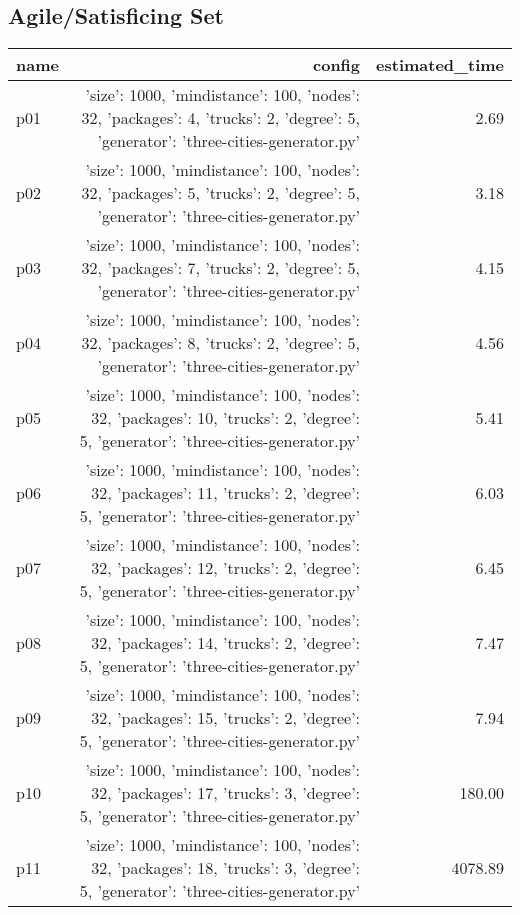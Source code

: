 \documentclass{article}
\begin{document}
                                \subsection*{Agile/Satisficing Set}
                                
                            \begin{center}
                            \scriptsize
                            \begin{tabular}{@{}l|r|r@{}}
                            name & config & estimated\_time\\\midrule
                              p01&{'size': 1000, 'mindistance': 100, 'nodes': 32, 'packages': 4, 'trucks': 2, 'degree': 5, 'generator': 'three-cities-generator.py'}&2.69\\
  p02&{'size': 1000, 'mindistance': 100, 'nodes': 32, 'packages': 5, 'trucks': 2, 'degree': 5, 'generator': 'three-cities-generator.py'}&3.18\\
  p03&{'size': 1000, 'mindistance': 100, 'nodes': 32, 'packages': 7, 'trucks': 2, 'degree': 5, 'generator': 'three-cities-generator.py'}&4.15\\
  p04&{'size': 1000, 'mindistance': 100, 'nodes': 32, 'packages': 8, 'trucks': 2, 'degree': 5, 'generator': 'three-cities-generator.py'}&4.56\\
  p05&{'size': 1000, 'mindistance': 100, 'nodes': 32, 'packages': 10, 'trucks': 2, 'degree': 5, 'generator': 'three-cities-generator.py'}&5.41\\
  p06&{'size': 1000, 'mindistance': 100, 'nodes': 32, 'packages': 11, 'trucks': 2, 'degree': 5, 'generator': 'three-cities-generator.py'}&6.03\\
  p07&{'size': 1000, 'mindistance': 100, 'nodes': 32, 'packages': 12, 'trucks': 2, 'degree': 5, 'generator': 'three-cities-generator.py'}&6.45\\
  p08&{'size': 1000, 'mindistance': 100, 'nodes': 32, 'packages': 14, 'trucks': 2, 'degree': 5, 'generator': 'three-cities-generator.py'}&7.47\\
  p09&{'size': 1000, 'mindistance': 100, 'nodes': 32, 'packages': 15, 'trucks': 2, 'degree': 5, 'generator': 'three-cities-generator.py'}&7.94\\
  p10&{'size': 1000, 'mindistance': 100, 'nodes': 32, 'packages': 17, 'trucks': 3, 'degree': 5, 'generator': 'three-cities-generator.py'}&180.00\\
  p11&{'size': 1000, 'mindistance': 100, 'nodes': 32, 'packages': 18, 'trucks': 3, 'degree': 5, 'generator': 'three-cities-generator.py'}&4078.89\\

\end{tabular}
\end{center}
\end{document}
